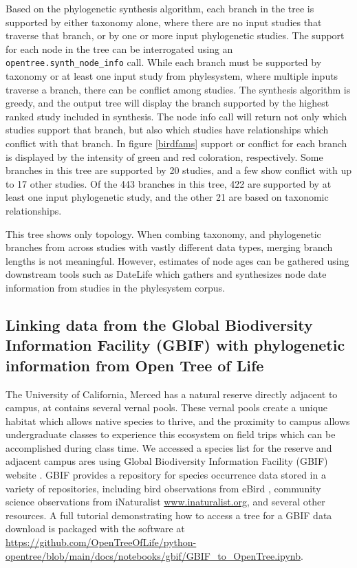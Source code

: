 \documentclass[oupdraft]{sysbio_sse}
\begin{document}
Based on the phylogenetic synthesis algorithm, each branch in the tree is supported by either taxonomy alone, where there are no input studies that traverse that branch, or by one or more input phylogenetic studies. 
The support for each node in the tree can be interrogated using an \texttt{opentree.synth\_node\_info} call.
While each branch must be supported by taxonomy or at least one input study from phylesystem, where multiple inputs traverse a branch, there can be conflict among studies.
The synthesis algorithm is greedy, and the output tree will display the branch supported by the highest ranked study included in synthesis.
The node info call will return not only which studies support that branch, but also which studies have relationships which conflict with that branch.
In figure \ref{birdfams} support or conflict for each branch is displayed by the intensity of green and red coloration, respectively. Some branches in this tree are supported by 20 studies, and a few show conflict with up to 17 other studies. Of the 443 branches in this tree, 422 are supported by at least one input phylogenetic study, and the other 21 are based on taxonomic relationships. 

This tree shows only topology. When combing taxonomy, and phylogenetic branches from across studies with vastly different data types, merging branch lengths is not meaningful. However, estimates of node ages can be gathered using downstream tools such as DateLife \citep{sanchez-reyes_datelife_2019} which gathers and synthesizes node date information from studies  in the phylesystem corpus.

\subsection{Linking data from the Global Biodiversity Information Facility (GBIF) with phylogenetic information from Open Tree of Life}

\bigskip

The University of California, Merced has a natural reserve directly adjacent to campus, at contains several vernal pools. These vernal pools create a unique habitat which allows native species to thrive, and the proximity to campus allows undergraduate classes to experience this ecosystem on field trips which can be accomplished during class time. 
We accessed a species list for the reserve and adjacent campus ares using Global Biodiversity Information Facility (GBIF) website \citep{gbif_secretariat_gbif_2019}. GBIF provides a repository for species occurrence data stored in a variety of repositories, including bird observations from eBird \citep{sullivan_ebird_2009}, community science observations from iNaturalist \url{www.inaturalist.org}, and several other resources. A full tutorial demonstrating how to access a tree for a GBIF data download is packaged with the software at \url{https://github.com/OpenTreeOfLife/python-opentree/blob/main/docs/notebooks/gbif/GBIF_to_OpenTree.ipynb}.
\end{document}
